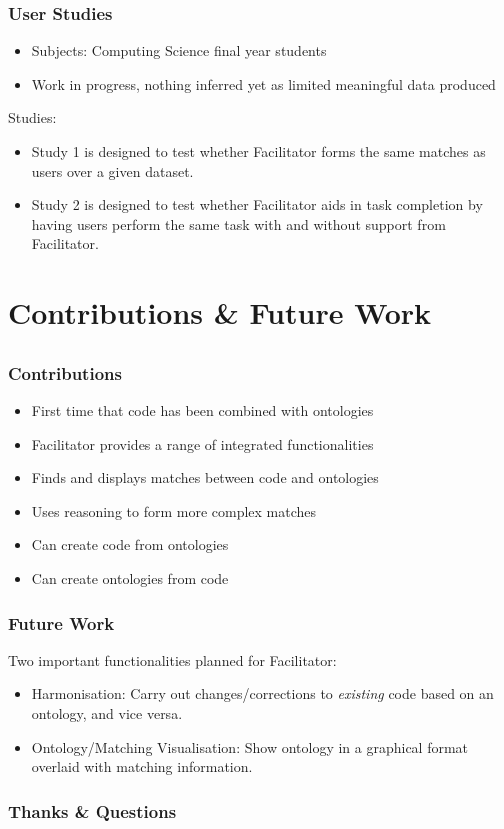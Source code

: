 \documentclass{beamer}
\newcommand{\myemph}[1]{{\bf {\color{emcolor}{#1}}}}
\begin{document}
\begin{frame}
  \frametitle{User Studies}
  \begin{itemize}
  	\item Subjects: Computing Science final year students
    \item Work in progress, nothing inferred yet as limited meaningful data produced
  \end{itemize}
  Studies:
  \begin{itemize}
    \item Study 1 is designed to test whether Facilitator forms the same matches as users over a given dataset.
    \item Study 2 is designed to test whether Facilitator aids in task completion by having users perform the same task with and without support from Facilitator.
  \end{itemize}
\end{frame}

\section{Contributions \& Future Work}
\subsection{}

\begin{frame}
\frametitle{Contributions}
\begin{itemize}
\item First time that code has been combined with ontologies
\item Facilitator provides a range of integrated functionalities
\item Finds and displays matches between code and ontologies
\item Uses reasoning to form more complex matches
\item Can create code from ontologies
\item Can create ontologies from code
\end{itemize}
\end{frame}

\begin{frame}
\frametitle{Future Work}
Two important functionalities planned for Facilitator:
\begin{itemize}
\item Harmonisation: Carry out changes/corrections to \textit{existing} code based on an ontology, and vice versa. 
\item Ontology/Matching Visualisation: Show ontology in a graphical format overlaid with matching information.
\end{itemize}
\end{frame}

\begin{frame}
\frametitle{Thanks \& Questions}
\centerline{\Huge \myemph{Thanks for your attention!}}

\centerline{\Huge \myemph{Questions?}}
\end{frame}
\end{document}
